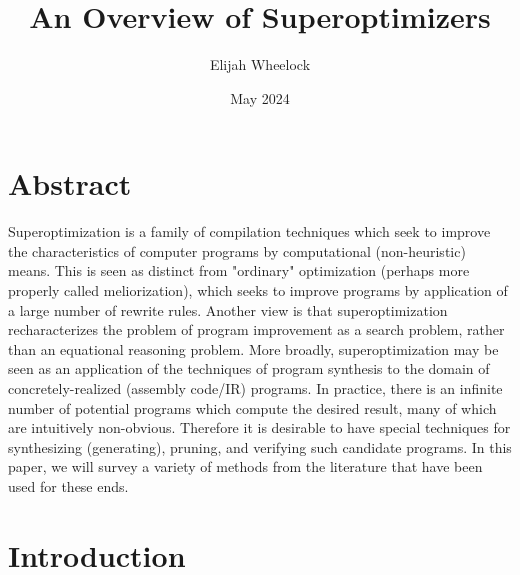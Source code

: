 \documentclass[12pt,twoside]{reedthesis}
\title{An Overview of Superoptimizers}
\author{Elijah Wheelock}
\date{May 2024}
\begin{document}
\maketitle
\frontmatter %
\pagestyle{empty} %
\tableofcontents

\chapter*{Abstract} %

Superoptimization is a family of compilation techniques which seek to improve the characteristics of computer programs by computational (non-heuristic) means.
This is seen as distinct from "ordinary" optimization (perhaps more properly called meliorization), which seeks to improve programs by application of a large number of rewrite rules.
Another view is that superoptimization recharacterizes the problem of program improvement as a search problem, rather than an equational reasoning problem.
More broadly, superoptimization may be seen as an application of the techniques of program synthesis to the domain of concretely-realized (assembly code/IR) programs.
In practice, there is an infinite number of potential programs which compute the desired result, many of which are intuitively non-obvious.
Therefore it is desirable to have special techniques for synthesizing (generating), pruning, and verifying such candidate programs. 
In this paper, we will survey a variety of methods from the literature that have been used for these ends.

\mainmatter %
\pagestyle{fancyplain} %
\chapter*{Introduction} %
    \singlespacing %
\end{document}
